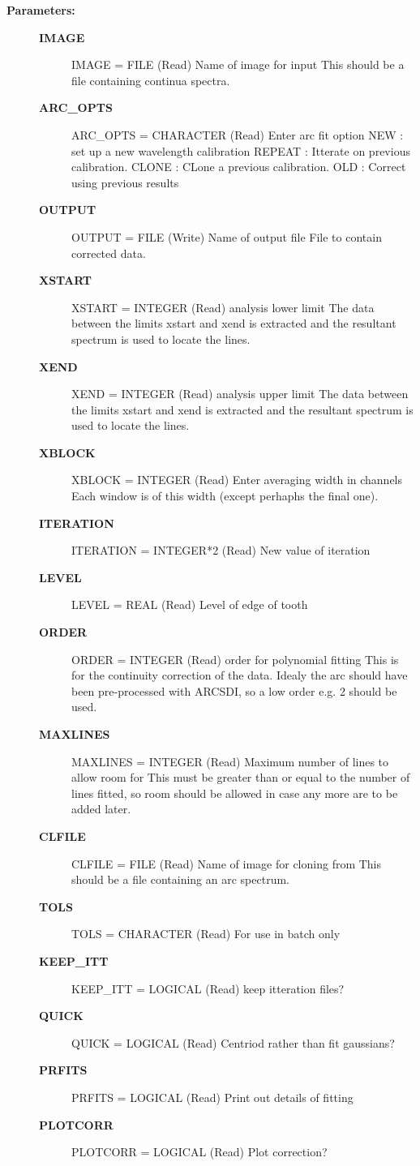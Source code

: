 \begin{description}
\item [{\bf Parameters:}]
\begin{description}
\item [{\bf IMAGE}]
    IMAGE = FILE (Read)
        Name of image for input
          This should be a file containing continua spectra.
\item [{\bf ARC_OPTS}]
    ARC_OPTS = CHARACTER (Read)
        Enter arc fit option
          NEW    : set up a new wavelength calibration
          REPEAT : Itterate on previous calibration.
          CLONE  : CLone a previous calibration.
          OLD    : Correct using previous results
\item [{\bf OUTPUT}]
    OUTPUT = FILE (Write)
        Name of output file
           File to contain corrected data.
\item [{\bf XSTART}]
    XSTART = INTEGER (Read)
        analysis lower limit
            The data between the limits xstart and xend is extracted
            and the resultant spectrum is used to locate the lines.
\item [{\bf XEND}]
    XEND = INTEGER (Read)
        analysis upper limit
            The data between the limits xstart and xend is extracted
            and the resultant spectrum is used to locate the lines.
\item [{\bf XBLOCK}]
    XBLOCK = INTEGER (Read)
        Enter averaging width in channels
            Each window is of this width (except perhaphs the final one).
\item [{\bf ITERATION}]
    ITERATION = INTEGER*2 (Read)
        New value of iteration
\item [{\bf LEVEL}]
    LEVEL = REAL (Read)
        Level of edge of tooth
\item [{\bf ORDER}]
    ORDER = INTEGER (Read)
        order for polynomial fitting
          This is for the continuity correction of the data. Idealy the
          arc should have been pre-processed with ARCSDI, so a low
          order e.g. 2 should be used.
\item [{\bf MAXLINES}]
    MAXLINES = INTEGER (Read)
        Maximum number of lines to allow room for
          This must be greater than or equal to the number of lines
          fitted, so room should be allowed in case any more are
          to be added later.
\item [{\bf CLFILE}]
    CLFILE = FILE (Read)
        Name of image for cloning from
          This should be a file containing an arc spectrum.
\item [{\bf TOLS}]
    TOLS = CHARACTER (Read)
        For use in batch only
\item [{\bf KEEP_ITT}]
    KEEP_ITT = LOGICAL (Read)
        keep itteration files?
\item [{\bf QUICK}]
    QUICK = LOGICAL (Read)
        Centriod rather than fit gaussians?
\item [{\bf PRFITS}]
    PRFITS = LOGICAL (Read)
        Print out details of fitting
\item [{\bf PLOTCORR}]
    PLOTCORR = LOGICAL (Read)
        Plot correction?
\end{description}


\end{description}
